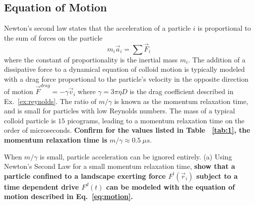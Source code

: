 \documentclass[twocolumn,preprintnumbers,amsmath,amssymb,aps,prx]{revtex4}
\begin{document}
\label{ex:reynolds}

\subsection{Equation of Motion}
  \label{ex:n2l}
  
  Newton's second law states that
  the acceleration of a particle $i$
  is proportional to 
  the sum of forces on the particle 
  \begin{equation}
  m_i \vec{a}_i = \sum \vec{F}_i
  \label{eq:n2l}
  \end{equation}
  where the constant of proportionality is the
  inertial mass $m_i$.  
  The addition of a dissipative force to a dynamical equation 
  of colloid motion 
  is typically modeled
  with a drag force proportional to the particle's velocity
  in the opposite direction of motion 
  $\vec{F}^{drag} = - \gamma \vec{v}_i$
  where $\gamma = 3 \pi \eta D$ is the drag coefficient
  described in Ex.~\ref{ex:reynolds}.
  The ratio of $m/\gamma$ is %
  known as the momentum relaxation time, %
  and is small for
  particles with low Reynolds numbers.
  The mass of a
  typical colloid particle is $15$ picograms,
  leading to a momentum relaxation time
  on the order of microseconds.
  {\bf Confirm for the values listed in Table ~\ref{tab:1},
  the momentum relaxation time is }
  $m/\gamma \approx 0.5 ~\mu s$. 
  
  When $m/\gamma$ is small,
  particle acceleration can be ignored
  entirely.
  (a) Using Newton's Second Law for
  a small momentum relaxation time, 
  {\bf show that a particle confined to a landscape exerting force
  $F^l(\vec{r}_i)$ subject to a time dependent drive $F^d(t)$
  can be modeled with the equation of motion described in 
  Eq.~\ref{eq:motion}. }


\end{document}
